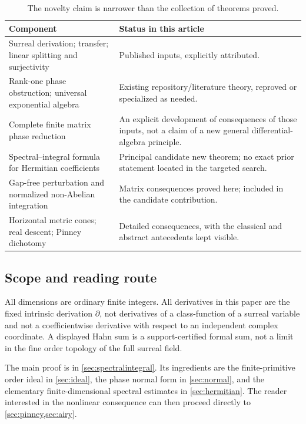 \documentclass[11pt,a4paper]{article}
\numberwithin{equation}{section}
\theoremstyle{definition}
\theoremstyle{remark}
\begin{document}
\begin{table}[ht]
\centering\small
\begin{tabularx}{\textwidth}{@{}p{}L@{}}
\toprule
Component & Status in this article\\
\midrule
Surreal derivation; transfer; linear splitting and surjectivity & Published inputs, explicitly attributed.\\
Rank-one phase obstruction; universal exponential algebra & Existing repository/literature theory, reproved or specialized as needed.\\
Complete finite matrix phase reduction & An explicit development of consequences of those inputs, not a claim of a new general differential-algebra principle.\\
Spectral--integral formula for Hermitian coefficients & Principal candidate new theorem; no exact prior statement located in the targeted search.\\
Gap-free perturbation and normalized non-Abelian integration & Matrix consequences proved here; included in the candidate contribution.\\
Horizontal metric cones; real descent; Pinney dichotomy & Detailed consequences, with the classical and abstract antecedents kept visible.\\
\bottomrule
\end{tabularx}
\caption{The novelty claim is narrower than the collection of theorems proved.}
\end{table}

\subsection{Scope and reading route}
All dimensions are ordinary finite integers. All derivatives in this paper
are the fixed intrinsic derivation $\partial$, not derivatives of a
class-function of a surreal variable and not a coefficientwise derivative
with respect to an independent complex coordinate. A displayed Hahn sum
is a support-certified formal sum, not a limit in the fine order topology
of the full surreal field.

The main proof is in \cref{sec:spectralintegral}. Its ingredients are the
finite-primitive order ideal in \cref{sec:ideal}, the phase normal form in
\cref{sec:normal}, and the elementary finite-dimensional spectral estimates
in \cref{sec:hermitian}. The reader interested in the nonlinear consequence
can then proceed directly to \cref{sec:pinney,sec:airy}.
\end{document}
